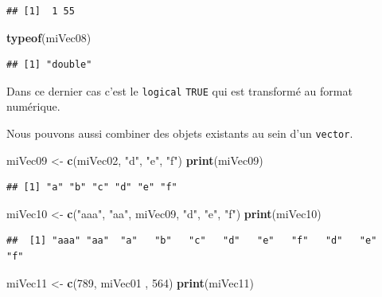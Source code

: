 \documentclass[
]{book}
\newenvironment{Shaded}{\begin{snugshade}}{\end{snugshade}}
\newcommand{\DecValTok}[1]{\textcolor[rgb]{0.00,0.00,0.81}{#1}}
\newcommand{\KeywordTok}[1]{\textcolor[rgb]{0.13,0.29,0.53}{\textbf{#1}}}
\newcommand{\NormalTok}[1]{#1}
\newcommand{\StringTok}[1]{\textcolor[rgb]{0.31,0.60,0.02}{#1}}
\begin{document}
\begin{verbatim}
## [1]  1 55
\end{verbatim}

\begin{Shaded}
\begin{Highlighting}[]
\KeywordTok{typeof}\NormalTok{(miVec08)}
\end{Highlighting}
\end{Shaded}

\begin{verbatim}
## [1] "double"
\end{verbatim}

Dans ce dernier cas c'est le \texttt{logical} \texttt{TRUE} qui est transformé au format numérique.

Nous pouvons aussi combiner des objets existants au sein d'un \texttt{vector}.

\begin{Shaded}
\begin{Highlighting}[]
\NormalTok{miVec09 <-}\StringTok{ }\KeywordTok{c}\NormalTok{(miVec02, }\StringTok{"d"}\NormalTok{, }\StringTok{"e"}\NormalTok{, }\StringTok{"f"}\NormalTok{)}
\KeywordTok{print}\NormalTok{(miVec09)}
\end{Highlighting}
\end{Shaded}

\begin{verbatim}
## [1] "a" "b" "c" "d" "e" "f"
\end{verbatim}

\begin{Shaded}
\begin{Highlighting}[]
\NormalTok{miVec10 <-}\StringTok{ }\KeywordTok{c}\NormalTok{(}\StringTok{"aaa"}\NormalTok{, }\StringTok{"aa"}\NormalTok{, miVec09, }\StringTok{"d"}\NormalTok{, }\StringTok{"e"}\NormalTok{, }\StringTok{"f"}\NormalTok{)}
\KeywordTok{print}\NormalTok{(miVec10)}
\end{Highlighting}
\end{Shaded}

\begin{verbatim}
##  [1] "aaa" "aa"  "a"   "b"   "c"   "d"   "e"   "f"   "d"   "e"   "f"
\end{verbatim}

\begin{Shaded}
\begin{Highlighting}[]
\NormalTok{miVec11 <-}\StringTok{ }\KeywordTok{c}\NormalTok{(}\DecValTok{789}\NormalTok{, miVec01 , }\DecValTok{564}\NormalTok{)}
\KeywordTok{print}\NormalTok{(miVec11)}
\end{Highlighting}
\end{Shaded}
\end{document}
